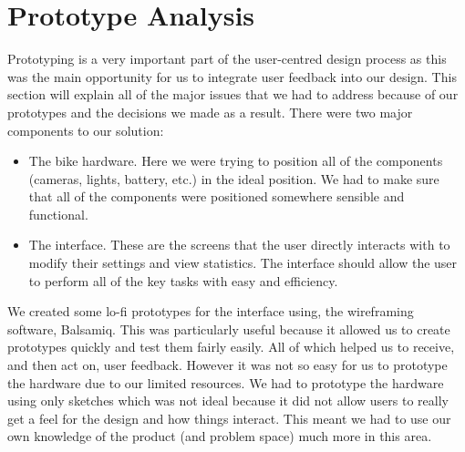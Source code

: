 \documentclass[a4paper]{report}
\begin{document}
{\chapter{Prototype Analysis}
\label{ch: prototype}
Prototyping is a very important part of the user-centred design process as this was the main opportunity for us to integrate user feedback into our design. This section will explain all of the major issues that we had to address because of our prototypes and the decisions we made as a result. There were two major components to our solution:
\begin{itemize}
  \item The bike hardware. Here we were trying to position all of the components (cameras, lights, battery, etc.) in the ideal position. We had to make sure that all of the components were positioned somewhere sensible and functional.
  \item The interface. These are the screens that the user directly interacts with to modify their settings and view statistics. The interface should allow the user to perform all of the key tasks with easy and efficiency.
\end{itemize}
We created some lo-fi prototypes for the interface using, the wireframing software, Balsamiq\cite{balsamiq}. This was particularly useful because it allowed us to create prototypes quickly and test them fairly easily. All of which helped us to receive, and then act on, user feedback. However it was not so easy for us to prototype the hardware due to our limited resources. We had to prototype the hardware using only sketches which was not ideal because it did not allow users to really get a feel for the design and how things interact. This meant we had to use our own knowledge of the product (and problem space) much more in this area.

}
\end{document}

